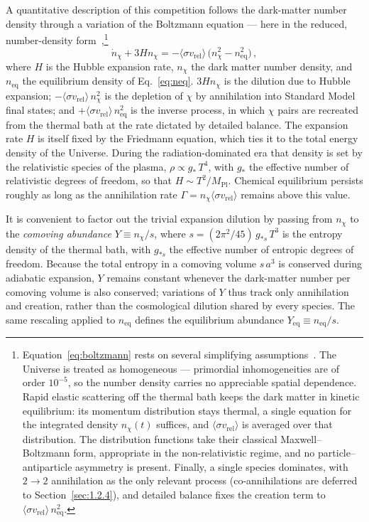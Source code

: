A quantitative description of this competition follows the dark-matter number density through a variation of the Boltzmann equation --- here in the reduced, number-density form~\cite{Gondolo:1990dk},\footnote{Equation~\eqref{eq:boltzmann} rests on several simplifying assumptions~\cite{Gondolo:1990dk}. The Universe is treated as homogeneous --- primordial inhomogeneities are of order $10^{-5}$, so the number density carries no appreciable spatial dependence. Rapid elastic scattering off the thermal bath keeps the dark matter in kinetic equilibrium: its momentum distribution stays thermal, a single equation for the integrated density $n_\chi(t)$ suffices, and $\langle \sigma v_\mathrm{rel}\rangle$ is averaged over that distribution. The distribution functions take their classical Maxwell--Boltzmann form, appropriate in the non-relativistic regime, and no particle--antiparticle asymmetry is present. Finally, a single species dominates, with $2\to 2$ annihilation as the only relevant process (co-annihilations are deferred to Section~\ref{sec:1.2.4}), and detailed balance fixes the creation term to $\langle \sigma v_\mathrm{rel}\rangle\, n_\mathrm{eq}^2$.}
\begin{equation}
	\dot n_\chi + 3 H n_\chi = -\langle \sigma v_\mathrm{rel} \rangle\, \bigl( n_\chi^2 - n_\mathrm{eq}^2 \bigr)\,,
	\label{eq:boltzmann}
\end{equation}
where $H$ is the Hubble expansion rate, $n_\chi$ the dark matter number density, and $n_\mathrm{eq}$ the equilibrium density of Eq.~\eqref{eq:neq}.
$3 H n_\chi$ is the dilution due to Hubble expansion;  $-\langle \sigma v_\mathrm{rel}\rangle\, n_\chi^2$ is the depletion of $\chi$ by annihilation into Standard Model final states; and $+\langle \sigma v_\mathrm{rel}\rangle\, n_\mathrm{eq}^2$ is the inverse process, in which $\chi$ pairs are recreated from the thermal bath at the rate dictated by detailed balance.
The expansion rate $H$ is itself fixed by the Friedmann equation, which ties it to the total energy density of the Universe.
During the radiation-dominated era that density is set by the relativistic species of the plasma, $\rho \propto g_*\, T^4$, with $g_*$ the effective number of relativistic degrees of freedom, so that $H \sim T^2/M_\mathrm{Pl}$.
Chemical equilibrium persists roughly as long as the annihilation rate $\Gamma = n_\chi \langle \sigma v_\mathrm{rel}\rangle$ remains above this value.

It is convenient to factor out the trivial expansion dilution by passing from $n_\chi$ to the \emph{comoving abundance} $Y \equiv n_\chi / s$, where $s = (2\pi^2/45)\, g_{*s}\, T^3$ is the entropy density of the thermal bath, with $g_{*s}$ the effective number of entropic degrees of freedom.
Because the total entropy in a comoving volume $s\,a^3$ is conserved during adiabatic expansion, $Y$ remains constant whenever the dark-matter number per comoving volume is also conserved; variations of $Y$ thus track only annihilation and creation, rather than the cosmological dilution shared by every species.
The same rescaling applied to $n_\mathrm{eq}$ defines the equilibrium abundance $Y_\mathrm{eq} \equiv n_\mathrm{eq}/s$.


